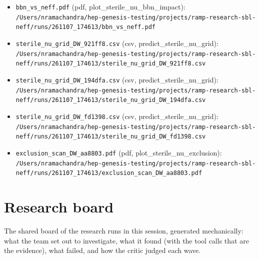 \documentclass[11pt,a4paper]{article}
\begin{document}
\begin{itemize}
  \item \texttt{bbn\_\allowbreak{}vs\_\allowbreak{}neff.pdf} (pdf, plot\_sterile\_nu\_bbn\_impact): \texttt{/\allowbreak{}Users/\allowbreak{}nramachandra/\allowbreak{}hep-genesis-testing/\allowbreak{}projects/\allowbreak{}ramp-research-sbl-neff/\allowbreak{}runs/\allowbreak{}261107\_\allowbreak{}174613/\allowbreak{}bbn\_\allowbreak{}vs\_\allowbreak{}neff.pdf}
  \item \texttt{sterile\_\allowbreak{}nu\_\allowbreak{}grid\_\allowbreak{}DW\_\allowbreak{}921ff8.csv} (csv, predict\_sterile\_nu\_grid): \texttt{/\allowbreak{}Users/\allowbreak{}nramachandra/\allowbreak{}hep-genesis-testing/\allowbreak{}projects/\allowbreak{}ramp-research-sbl-neff/\allowbreak{}runs/\allowbreak{}261107\_\allowbreak{}174613/\allowbreak{}sterile\_\allowbreak{}nu\_\allowbreak{}grid\_\allowbreak{}DW\_\allowbreak{}921ff8.csv}
  \item \texttt{sterile\_\allowbreak{}nu\_\allowbreak{}grid\_\allowbreak{}DW\_\allowbreak{}194dfa.csv} (csv, predict\_sterile\_nu\_grid): \texttt{/\allowbreak{}Users/\allowbreak{}nramachandra/\allowbreak{}hep-genesis-testing/\allowbreak{}projects/\allowbreak{}ramp-research-sbl-neff/\allowbreak{}runs/\allowbreak{}261107\_\allowbreak{}174613/\allowbreak{}sterile\_\allowbreak{}nu\_\allowbreak{}grid\_\allowbreak{}DW\_\allowbreak{}194dfa.csv}
  \item \texttt{sterile\_\allowbreak{}nu\_\allowbreak{}grid\_\allowbreak{}DW\_\allowbreak{}fd1398.csv} (csv, predict\_sterile\_nu\_grid): \texttt{/\allowbreak{}Users/\allowbreak{}nramachandra/\allowbreak{}hep-genesis-testing/\allowbreak{}projects/\allowbreak{}ramp-research-sbl-neff/\allowbreak{}runs/\allowbreak{}261107\_\allowbreak{}174613/\allowbreak{}sterile\_\allowbreak{}nu\_\allowbreak{}grid\_\allowbreak{}DW\_\allowbreak{}fd1398.csv}
  \item \texttt{exclusion\_\allowbreak{}scan\_\allowbreak{}DW\_\allowbreak{}aa8803.pdf} (pdf, plot\_sterile\_nu\_exclusion): \texttt{/\allowbreak{}Users/\allowbreak{}nramachandra/\allowbreak{}hep-genesis-testing/\allowbreak{}projects/\allowbreak{}ramp-research-sbl-neff/\allowbreak{}runs/\allowbreak{}261107\_\allowbreak{}174613/\allowbreak{}exclusion\_\allowbreak{}scan\_\allowbreak{}DW\_\allowbreak{}aa8803.pdf}
\end{itemize}

\section{Research board}
\label{app:board}
The shared board of the research runs in this session, generated mechanically: what the team set out to investigate, what it found (with the tool calls that are the evidence), what failed, and how the critic judged each wave.
\end{document}
